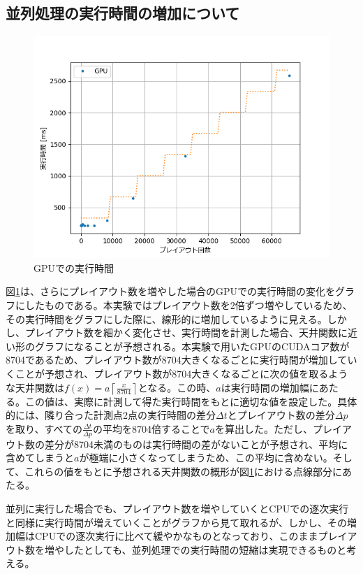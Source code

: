\documentclass[10pt, a4paper]{jsarticle}
\begin{document}
\subsection{並列処理の実行時間の増加について}
\begin{figure}[ht]
    \begin{center}
        \includegraphics[width=12cm]{img/gpu_time_wCeil.png}
        \caption{GPUでの実行時間}
        \label{fig:gpu_time}
    \end{center}
\end{figure}
\par 図\ref{fig:gpu_time}は、さらにプレイアウト数を増やした場合のGPUでの実行時間の変化をグラフにしたものである。本実験ではプレイアウト数を2倍ずつ増やしているため、その実行時間をグラフにした際に、線形的に増加しているように見える。しかし、プレイアウト数を細かく変化させ、実行時間を計測した場合、天井関数に近い形のグラフになることが予想される。本実験で用いたGPUのCUDAコア数が8704であるため、プレイアウト数が8704大きくなるごとに実行時間が増加していくことが予想され、プレイアウト数が8704大きくなるごとに次の値を取るような天井関数は$f(x) = a\left\lceil\frac{x}{8704}\right\rceil$となる。この時、$a$は実行時間の増加幅にあたる。この値は、実際に計測して得た実行時間をもとに適切な値を設定した。具体的には、隣り合った計測点2点の実行時間の差分$\Delta t$とプレイアウト数の差分$\Delta p$を取り、すべての$\frac{\Delta t}{\Delta p}$の平均を8704倍することで$a$を算出した。ただし、プレイアウト数の差分が8704未満のものは実行時間の差がないことが予想され、平均に含めてしまうと$a$が極端に小さくなってしまうため、この平均に含めない。そして、これらの値をもとに予想される天井関数の概形が図\ref{fig:gpu_time}における点線部分にあたる。
\par 並列に実行した場合でも、プレイアウト数を増やしていくとCPUでの逐次実行と同様に実行時間が増えていくことがグラフから見て取れるが、しかし、その増加幅はCPUでの逐次実行に比べて緩やかなものとなっており、このままプレイアウト数を増やしたとしても、並列処理での実行時間の短縮は実現できるものと考える。
\end{document}
